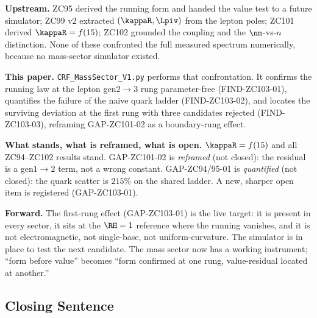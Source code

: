 \documentclass[12pt, a4paper]{article}
\begin{document}
\begin{genealogybox}[title={How ZC103 Sits in the Corpus --- the Instrument Returns}]
\textbf{Upstream.}
ZC95 derived the running form and handed the value test to a future simulator;
ZC99 v2 extracted $(\kappaR,\Lpiv)$ from the lepton poles; ZC101 derived
$\kappaR=f(15)$; ZC102 grounded the coupling and the $\nm$-vs-$n$ distinction.
None of these confronted the full measured spectrum numerically, because no
mass-sector simulator existed.

\textbf{This paper.}
\texttt{CRF\_MassSector\_V1.py} performs that confrontation. It confirms the
running law at the lepton gen$2{\to}3$ rung parameter-free (FIND-ZC103-01),
quantifies the failure of the naive quark ladder (FIND-ZC103-02), and locates
the surviving deviation at the first rung with three candidates rejected
(FIND-ZC103-03), reframing GAP-ZC101-02 as a boundary-rung effect.

\textbf{What stands, what is reframed, what is open.}
$\kappaR=f(15)$ and all ZC94--ZC102 results stand. GAP-ZC101-02 is
\emph{reframed} (not closed): the residual is a gen$1{\to}2$ term, not a wrong
constant. GAP-ZC94/95-01 is \emph{quantified} (not closed): the quark scatter is
$215\%$ on the shared ladder. A new, sharper open item is registered
(GAP-ZC103-01).

\textbf{Forward.}
The first-rung effect (GAP-ZC103-01) is the live target: it is present in every
sector, it sits at the $\RH=1$ reference where the running vanishes, and it is
not electromagnetic, not single-base, not uniform-curvature. The simulator is in
place to test the next candidate. The mass sector now has a working instrument;
``form before value'' becomes ``form confirmed at one rung, value-residual
located at another.''
\end{genealogybox}

\subsection{Closing Sentence}
\end{document}
